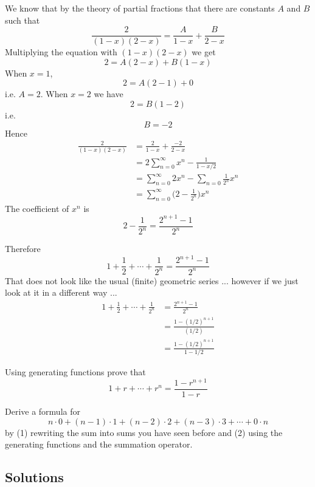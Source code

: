 We know that by the theory of partial fractions 
that there are constants $A$ and $B$ such that
\[
\frac{2}{(1 - x)(2 - x)} 
= \frac{A}{1 - x} + \frac{B}{2 - x}
\]
Multiplying the equation with $(1-x)(2-x)$ we get
\[
2 =  A(2 - x) + B(1 - x)
\]
When $x = 1$,
\[
2 = A(2 - 1) +  0
\]
i.e. $A = 2$.
When $x = 2$ we have
\[
2 = B(1 - 2)
\]
i.e.
\[
B = -2
\]
Hence
\begin{align*}
\frac{2}{(1 - x)(2 - x)} 
&= \frac{2}{1 - x} +  \frac{-2}{2 - x} \\
&= 2 \sum_{n=0}^\infty x^n - \frac{1}{1 - x/2} \\
&= \sum_{n=0}^\infty 2x^n - \sum_{n=0} \frac{1}{2^n} x^n \\
&= \sum_{n=0}^\infty \biggl( 2 - \frac{1}{2^n} \biggr) x^n
\end{align*}
The coefficient of $x^n$ is
\[
2 - \frac{1}{2^n} = \frac{2^{n+1} - 1}{2^n}
\]

Therefore
\[
1 + \frac{1}{2} + \cdots + \frac{1}{2^n}
=
\frac{2^{n+1} - 1}{2^n}
\]
That does not look like the usual (finite) geometric series ...
however if we just look at it in a different way ...
\begin{align*}
1 + \frac{1}{2} + \cdots + \frac{1}{2^n}
&= \frac{2^{n+1} - 1}{2^n} \\
&= \frac{1 - (1/2)^{n+1}}{(1/2)} \\
&= \frac{1 - (1/2)^{n+1}}{1 - 1/2}
\end{align*}


\newpage
\begin{ex}
Using generating functions prove that
\[
1 + r + \cdots + r^n = \frac{1 - r^{n+1}}{1 - r}
\]
\end{ex}



\newpage
\begin{ex}
Derive a formula for 
\[
n \cdot 0 + (n-1) \cdot 1 + (n-2) \cdot 2
+ (n-3) \cdot 3 + \cdots +
0 \cdot n
\]
by (1) rewriting the sum into sums you have seen before and
(2) using the generating functions and the summation operator. 
\end{ex}

\newpage
\subsection*{Solutions}

